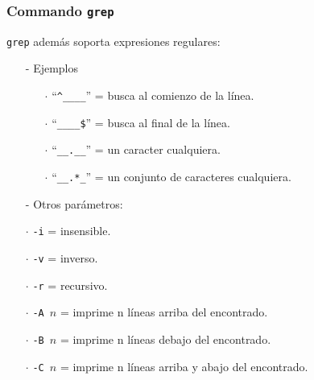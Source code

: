 \documentclass{beamer}
\begin{document}
\begin{frame}[fragile,t]
    \frametitle{Commando \texttt{grep}}
    \verb|grep| además soporta expresiones regulares:\\
    \vspace{0.2cm}
    \begin{itemize}
    \item[-] Ejemplos
    \begin{itemize}
    \item[$\cdot$] ``\verb|^____|'' = busca al comienzo de la línea.
    \item[$\cdot$] ``\verb|____$|'' = busca al final de la línea.
    \item[$\cdot$] ``\verb|__.__|'' = un caracter cualquiera.
    \item[$\cdot$] ``\verb|__.*_|'' = un conjunto de caracteres cualquiera.
    \end{itemize}
    \vspace{0.2cm}
    \item[-] Otros parámetros:
    \item[$\cdot$] \verb|-i| = insensible.
    \item[$\cdot$] \verb|-v| = inverso.
    \item[$\cdot$] \verb|-r| = recursivo.
    \item[$\cdot$] \verb|-A |$n$ = imprime n líneas arriba del encontrado.
    \item[$\cdot$] \verb|-B |$n$ = imprime n líneas debajo del encontrado.
    \item[$\cdot$] \verb|-C |$n$ = imprime n líneas arriba y abajo del encontrado.
    \end{itemize}
\end{frame}
\end{document}
